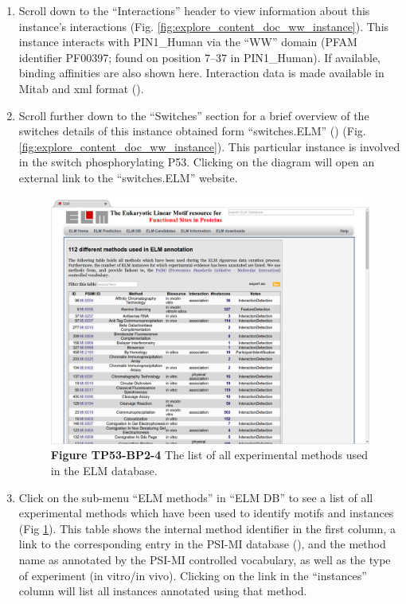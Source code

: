 \begin{enumerate}
\item Scroll down to the ``Interactions'' header to view information about this
	instance's interactions
	(Fig.  \ref{fig:explore_content_doc_ww_instance}). This instance
	interacts with PIN1\_Human via the ``WW'' domain (PFAM identifier
	PF00397; found on position 7--37 in PIN1\_Human). If available,
	binding affinities are also shown here. Interaction data is made
	available in Mitab and xml format (\cite{17925023}).  

\item Scroll further down to the ``Switches'' section for a brief overview of
	the switches details of this instance obtained form ``switches.ELM''
	(\cite{23550212}) (Fig. \ref{fig:explore_content_doc_ww_instance}). This
	particular instance is involved in the switch phosphorylating P53.
	Clicking on the diagram will open an external link to the
	``switches.ELM'' website.

\begin{figure}[h!]
	\centering
	\includegraphics[width=\textwidth]{Figures/explore_content/methods.png} 
	\caption{
	\textbf{Figure TP53-BP2-4}
	The list of all experimental methods used in the ELM database.
	}
	\label{fig:explore_content_methods}
\end{figure}

\item Click on the sub-menu ``ELM methods'' in ``ELM DB'' to see a list of all
	experimental methods which have been used to identify motifs and
	instances (Fig \ref{fig:explore_content_methods}).
	This table shows the internal method
	identifier in the first column, a link to the corresponding entry in
	the PSI-MI database (\cite{17925023}), and the method name as annotated
	by the PSI-MI controlled vocabulary, as well as the type of experiment
	(in vitro/in vivo). Clicking on the link in the ``instances'' column
	will list all instances annotated using that method.  


\end{enumerate}
